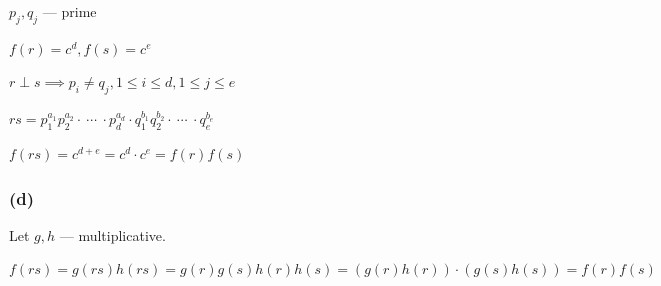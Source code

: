 \documentclass{article}
\begin{document}
\( p_{j}, q_{j} \) --- prime

\( f(r) = c^{d}, f(s)=c^{e} \)

\( r \perp s \implies p_{i} \neq q_{j}, 1 \leq i \leq d, 1 \leq j \leq e \)

\( rs = p_{1}^{a_{1}} p_{2}^{a_{2}} \cdot\ \cdots\ \cdot p_{d}^{a_{d}} \cdot q_{1}^{b_{1}} q_{2}^{b_{2}} \cdot\ \cdots\ \cdot q_{e}^{b_{e}} \)

\( f(rs) = c^{d+e} = c^{d} \cdot c^{e} = f(r)f(s) \)

\subsubsection*{(d)}

Let \( g,h \) --- multiplicative.

\( f(rs) = g(rs)h(rs) = g(r)g(s)h(r)h(s) = (g(r)h(r))\cdot(g(s)h(s)) = f(r)f(s) \)
\end{document}
